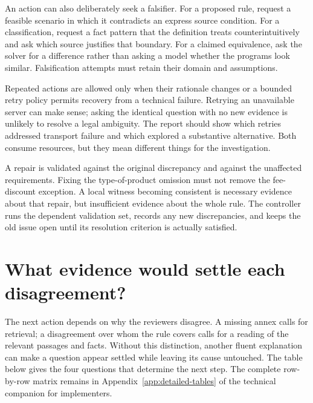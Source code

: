 
An action can also deliberately seek a falsifier. For a proposed rule, request a
feasible scenario in which it contradicts an express source condition. For a
classification, request a fact pattern that the definition treats counterintuitively
and ask which source justifies that boundary. For a claimed equivalence, ask the
solver for a difference rather than asking a model whether the programs look
similar. Falsification attempts must retain their domain and assumptions.

Repeated actions are allowed only when their rationale changes or a bounded retry
policy permits recovery from a technical failure. Retrying an unavailable server
can make sense; asking the identical question with no new evidence is unlikely
to resolve a legal ambiguity. The report should show which retries addressed
transport failure and which explored a substantive alternative. Both consume
resources, but they mean different things for the investigation.

A repair is validated against the original discrepancy and against the unaffected
requirements. Fixing the type-of-product omission must not remove the fee-discount
exception. A local witness becoming consistent is necessary evidence about that
repair, but insufficient evidence about the whole rule. The controller runs the
dependent validation set, records any new discrepancies, and keeps the old issue
open until its resolution criterion is actually satisfied.

\section{What evidence would settle each disagreement?}
\label{merge:M06:09}


The next action depends on why the reviewers disagree. A missing annex calls for
retrieval; a disagreement over whom the rule covers calls for a reading of the
relevant passages and facts. Without this distinction, another fluent
explanation can make a question appear settled while leaving its cause untouched.
The table below gives the four
questions that determine the next step. The complete row-by-row matrix remains
in Appendix~\ref{app:detailed-tables} of the technical companion for implementers.

